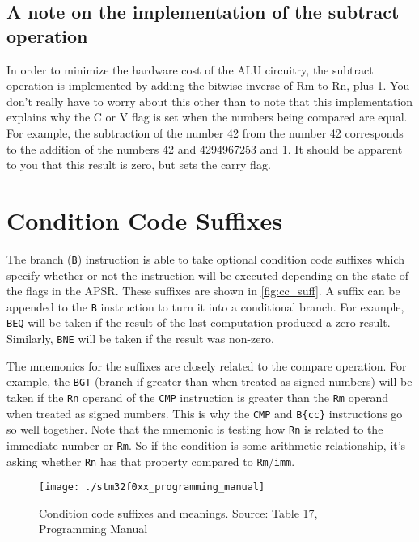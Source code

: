 \subsection{A note on the implementation of the subtract operation}
In order to minimize the hardware cost of the ALU circuitry, the subtract operation is implemented by adding the bitwise inverse of Rm to Rn, plus 1. You don't really have to worry about this other than to note that this implementation explains why the C or V flag is set when the numbers being compared are equal. For example, the subtraction of the number 42 from the number 42 corresponds to the addition of the numbers 42 and 4294967253 and 1. It should be apparent to you that this result is zero, but sets the carry flag. 


\section{Condition Code Suffixes} 
The branch (\texttt{B}) instruction is able to take optional condition code suffixes which specify whether or not the instruction will be executed depending on the state of the flags in the APSR. 
These suffixes are shown in \autoref{fig:cc_suff}. A suffix can be appended to the \texttt{B} instruction to turn it into a conditional branch. For example, \texttt{BEQ} will be taken if the result of the last computation produced a zero result. Similarly, \texttt{BNE} will be taken if the result was non-zero. 

The mnemonics for the suffixes are closely related to the compare operation. For example, the \texttt{BGT} (branch if greater than when treated as signed numbers) will be taken if the \texttt{Rn} operand of the \texttt{CMP} instruction is greater than the \texttt{Rm} operand when treated as signed numbers. This is why the \texttt{CMP} and \texttt{B\{cc\}}  instructions go so well together.
Note that the mnemonic is testing how \texttt{Rn} is related to the immediate number or \texttt{Rm}. So if the condition is some arithmetic relationship, it's asking whether \texttt{Rn} has that property compared to \texttt{Rm}/\texttt{imm}.

\begin{figure}
\centering
\texttt{[image: ./stm32f0xx\_programming\_manual]}
\caption{Condition code suffixes and meanings. Source: Table 17, Programming Manual}
\label{fig:cc_suff}
\end{figure}

